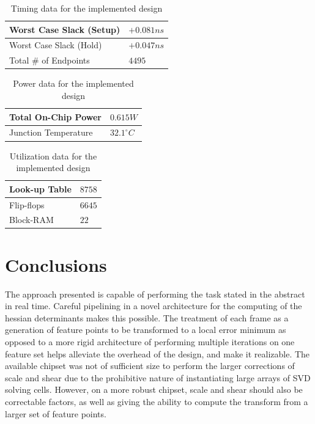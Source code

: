 \documentclass[sigconf]{acmart/acmart}
\begin{document}
\begin{table}[h]
	\centering
	\caption{Timing data for the implemented design}
	\begin{tabular}{l|l}
		Worst Case Slack (Setup) & $+0.081 ns$ \\
		\hline
		Worst Case Slack (Hold) & $+0.047 ns$ \\
		\hline
		Total \# of Endpoints & $4495$
	\end{tabular}
	\label{table_timing}
\end{table}

\begin{table}[h]
	\centering
	\caption{Power data for the implemented design}
	\begin{tabular}{l|l}
		Total On-Chip Power & $0.615 W$ \\
		\hline
		Junction Temperature & $32.1 ^{\circ} C$ 
	\end{tabular}
	\label{table_power}
\end{table}

\begin{table}[h]
	\centering
	\caption{Utilization data for the implemented design}
	\begin{tabular}{l|l}
		Look-up Table & $8758$ \\
		\hline
		Flip-flops & $6645$ \\
		\hline
		Block-RAM & $22$
	\end{tabular}
	\label{table_utilization}
\end{table}

\section{Conclusions}

The approach presented is capable of performing the task stated in the abstract in real time. Careful pipelining in a novel architecture for the computing of the hessian determinants makes this possible. The treatment of each frame as a generation of feature points to be transformed to a local error minimum as opposed to a more rigid architecture of performing multiple iterations on one feature set helps alleviate the overhead of the design, and make it realizable. The available chipset was not of sufficient size to perform the larger corrections of scale and shear due to the prohibitive nature of instantiating large arrays of SVD solving cells. However, on a more robust chipset, scale and shear should also be correctable factors, as well as giving the ability to compute the transform from a larger set of feature points.

\pagebreak
\clearpage



\end{document}

